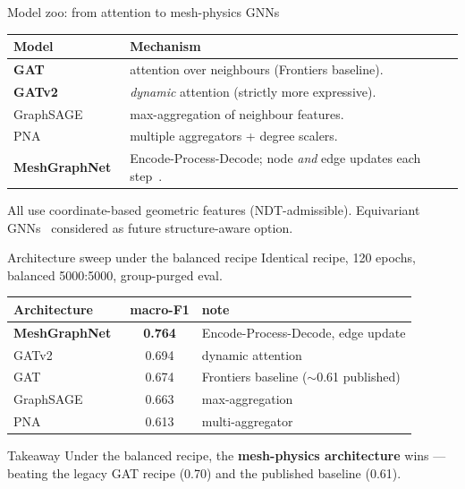 \documentclass[aspectratio=169,10pt]{beamer}
\newcommand{\best}[1]{{\color{okgreen}\textbf{#1}}}
\begin{document}
\begin{frame}{Model zoo: from attention to mesh-physics GNNs}
\begin{tabular}{p{2.4cm} p{8.0cm}}
\toprule
Model & Mechanism \\
\midrule
\textbf{GAT}~\cite{velickovic2018graph} & attention over neighbours (Frontiers baseline). \\
\textbf{GATv2}~\cite{brody2022how} & \emph{dynamic} attention (strictly more expressive). \\
GraphSAGE & max-aggregation of neighbour features. \\
PNA & multiple aggregators + degree scalers. \\
\textbf{MeshGraphNet}~\cite{pfaff2021learning} & Encode-Process-Decode; node \emph{and} edge
  updates each step~\cite{sanchezgonzalez2020learning}. \\
\bottomrule
\end{tabular}
\vspace{0.4em}
All use coordinate-based geometric features (NDT-admissible). Equivariant
GNNs~\cite{satorras2021equivariant} considered as future structure-aware option.
\end{frame}

\begin{frame}{Architecture sweep under the balanced recipe}
\centering
Identical recipe, 120 epochs, balanced 5000:5000, group-purged eval.
\vspace{0.5em}

\begin{tabular}{lcl}
\toprule
Architecture & macro-F1 & note \\
\midrule
\best{MeshGraphNet}~\cite{pfaff2021learning} & \best{0.764} & Encode-Process-Decode, edge update \\
GATv2~\cite{brody2022how}             & 0.694 & dynamic attention \\
GAT~\cite{velickovic2018graph}        & 0.674 & Frontiers baseline ($\sim$0.61 published) \\
GraphSAGE                             & 0.663 & max-aggregation \\
PNA                                   & 0.613 & multi-aggregator \\
\bottomrule
\end{tabular}

\vspace{0.6em}
\begin{block}{Takeaway}
Under the balanced recipe, the \textbf{mesh-physics architecture} wins —
beating the legacy GAT recipe (0.70) and the published baseline (0.61).
\end{block}
\end{frame}
\end{document}
